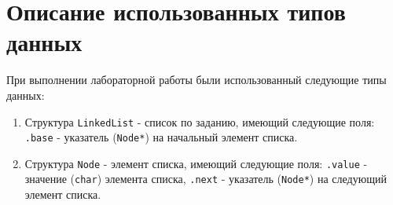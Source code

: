 \section{Описание использованных типов данных}

При выполнении лабораторной работы были использованный следующие типы данных:
\begin{enumerate}
    \item Структура \texttt{LinkedList} - список по заданию, имеющий следующие поля:
    \texttt{.base} - указатель (\texttt{Node*}) на начальный элемент списка.
    \item Структура \texttt{Node} - элемент списка, имеющий следующие поля:
    \texttt{.value} - значение (\texttt{char}) элемента списка,
    \texttt{.next} - указатель (\texttt{Node*}) на следующий элемент списка.
\end{enumerate}
